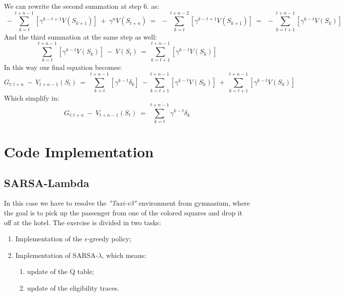 \documentclass[10pt,a4paper]{article}
\begin{document}
\noindent We can rewrite the second summation at step 6. as: 
\begin{equation*}
    \:-\sum_{k=t}^{t+n-1} [\gamma^{k-t+1} V(S_{k+1})] \:+\: \gamma^{n}V(S_{t+n}) \:=\: \:-\sum_{k=t}^{t+n-2} [\gamma^{k-t+1} V(S_{k+1})] \:=\: \:-\sum_{k=t+1}^{t+n-1} [\gamma^{k-t}V(S_k)]
\end{equation*}
\vspace{5pt}
And the third summation at the same step as well:
\begin{equation*}
    \sum_{k=t}^{t+n-1} [\gamma^{k-t}V(S_k)] \:-\: V(S_t) \:=\: \sum_{k=t+1}^{t+n-1} [\gamma^{k-t}V(S_k)]
\end{equation*}
\vspace{5pt}
In this way our final equation becomes:
\begin{equation*}
    G_{t:t+n} \:-\: V_{t+n-1}(S_t) \:=\: \sum_{k=t}^{t+n-1} [\gamma^{k-t}\delta_k] \:-\sum_{k=t+1}^{t+n-1} [\gamma^{k-t}V(S_k)] \:+\: \sum_{k=t+1}^{t+n-1} [\gamma^{k-t}V(S_k)]
\end{equation*}
\vspace{5pt}
Which simplify in:
\begin{equation*}
    G_{t:t+n} \:-\: V_{t+n-1}(S_t) \:=\: \sum_{k=t}^{t+n-1} \gamma^{k-t}\delta_k
\end{equation*}

\newpage
\section{Code Implementation}

\subsection{SARSA-Lambda}
In this case we have to resolve the \textit{"Taxi-v3"} environment from gymnasium, where the goal is to pick up the passenger from one of the colored squares and drop it off at the hotel. The exercise is divided in two tasks:
\begin{enumerate}
    \item Implementation of the $\epsilon$-greedy policy;
    \item Implementation of SARSA-$\lambda$, which means:
    \begin{enumerate}
        \item update of the Q table;
        \item update of the eligibility traces.
    \end{enumerate}
\end{enumerate}
\vspace{5pt}
\end{document}
